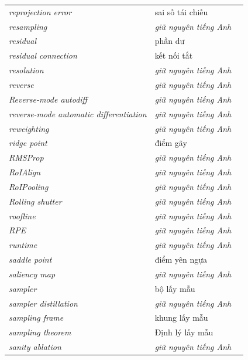 \documentclass[deep_learning.tex]{subfiles}
\begin{document}
\begin{longtable}{@{}L{5.2cm}L{5.9cm}L{2.6cm}@{}}
\emph{reprojection error} & sai số tái chiếu & \\
\emph{resampling} & \emph{\color{tiercol}giữ nguyên tiếng Anh} & \\
\emph{residual} & phần dư & \\
\emph{residual connection} & kết nối tắt & \\
\emph{resolution} & \emph{\color{tiercol}giữ nguyên tiếng Anh} & \\
\emph{reverse} & \emph{\color{tiercol}giữ nguyên tiếng Anh} & \\
\emph{Reverse-mode autodiff} & \emph{\color{tiercol}giữ nguyên tiếng Anh} & \\
\emph{reverse-mode automatic differentiation} & \emph{\color{tiercol}giữ nguyên tiếng Anh} & \\
\emph{reweighting} & \emph{\color{tiercol}giữ nguyên tiếng Anh} & \\
\emph{ridge point} & điểm gãy & \\
\emph{RMSProp} & \emph{\color{tiercol}giữ nguyên tiếng Anh} & \\
\emph{RoIAlign} & \emph{\color{tiercol}giữ nguyên tiếng Anh} & \\
\emph{RoIPooling} & \emph{\color{tiercol}giữ nguyên tiếng Anh} & \\
\emph{Rolling shutter} & \emph{\color{tiercol}giữ nguyên tiếng Anh} & \\
\emph{roofline} & \emph{\color{tiercol}giữ nguyên tiếng Anh} & \\
\emph{RPE} & \emph{\color{tiercol}giữ nguyên tiếng Anh} & \\
\emph{runtime} & \emph{\color{tiercol}giữ nguyên tiếng Anh} & \\
\emph{saddle point} & điểm yên ngựa & \\
\emph{saliency map} & \emph{\color{tiercol}giữ nguyên tiếng Anh} & \\
\emph{sampler} & bộ lấy mẫu & \\
\emph{sampler distillation} & \emph{\color{tiercol}giữ nguyên tiếng Anh} & \\
\emph{sampling frame} & khung lấy mẫu & \\
\emph{sampling theorem} & Định lý lấy mẫu & \\
\emph{sanity ablation} & \emph{\color{tiercol}giữ nguyên tiếng Anh} & \\

\end{longtable}
\end{document}
